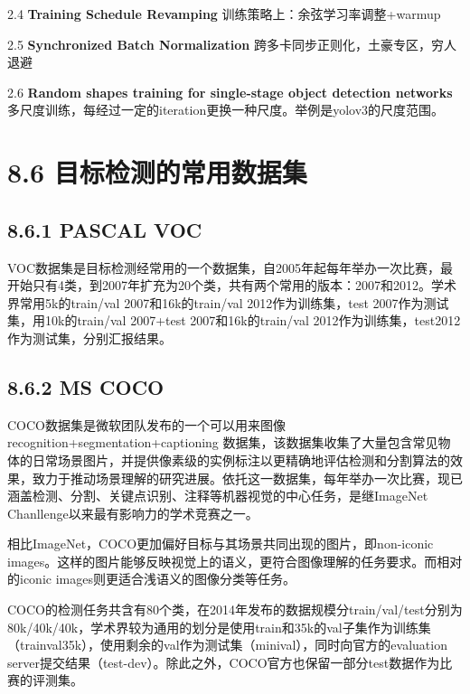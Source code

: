 2.4 \textbf{Training Schedule Revamping}
训练策略上：余弦学习率调整+warmup

2.5 \textbf{Synchronized Batch Normalization}
跨多卡同步正则化，土豪专区，穷人退避

2.6 \textbf{Random shapes training for single-stage object detection
networks}\\
多尺度训练，每经过一定的iteration更换一种尺度。举例是yolov3的尺度范围。

\section{8.6
目标检测的常用数据集}\label{ux76eeux6807ux68c0ux6d4bux7684ux5e38ux7528ux6570ux636eux96c6}

\subsection{8.6.1 PASCAL VOC}\label{pascal-voc}

​
VOC数据集是目标检测经常用的一个数据集，自2005年起每年举办一次比赛，最开始只有4类，到2007年扩充为20个类，共有两个常用的版本：2007和2012。学术界常用5k的train/val
2007和16k的train/val 2012作为训练集，test
2007作为测试集，用10k的train/val 2007+test 2007和16k的train/val
2012作为训练集，test2012作为测试集，分别汇报结果。

\subsection{8.6.2 MS COCO}\label{ms-coco}

​
COCO数据集是微软团队发布的一个可以用来图像recognition+segmentation+captioning
数据集，该数据集收集了大量包含常见物体的日常场景图片，并提供像素级的实例标注以更精确地评估检测和分割算法的效果，致力于推动场景理解的研究进展。依托这一数据集，每年举办一次比赛，现已涵盖检测、分割、关键点识别、注释等机器视觉的中心任务，是继ImageNet
Chanllenge以来最有影响力的学术竞赛之一。

相比ImageNet，COCO更加偏好目标与其场景共同出现的图片，即non-iconic
images。这样的图片能够反映视觉上的语义，更符合图像理解的任务要求。而相对的iconic
images则更适合浅语义的图像分类等任务。

​
COCO的检测任务共含有80个类，在2014年发布的数据规模分train/val/test分别为80k/40k/40k，学术界较为通用的划分是使用train和35k的val子集作为训练集（trainval35k），使用剩余的val作为测试集（minival），同时向官方的evaluation
server提交结果（test-dev）。除此之外，COCO官方也保留一部分test数据作为比赛的评测集。

